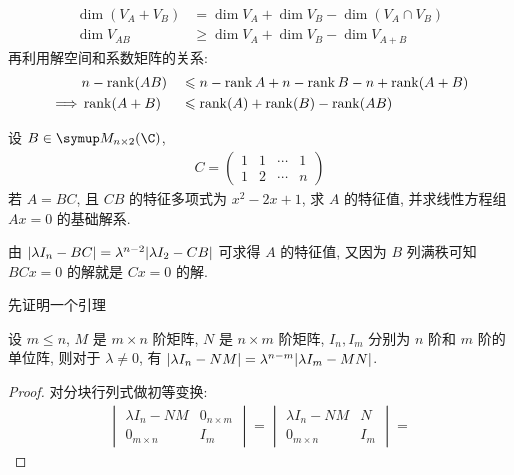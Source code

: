\begin{exercise}[series=exer]
\begin{answer}
\begin{align*}
          \dim(V_{A} + V_{B}) & = \dim V_{A} + \dim V_{B} - \dim(V_{A} \cap V_{B})\\
          \dim V_{AB} & \ge  \dim V_{A} + \dim V_{B} - \dim V_{A + B}
      \end{align*}
      再利用解空间和系数矩阵的关系:
      \begin{alignat*}{2}
          & n - \rank (AB) && \leqslant  n - \rank A + n - \rank B - n + \rank (A + B) \\
          \implies & \rank(A + B) && \leqslant \rank(A) + \rank(B) - \rank(AB)
      \end{alignat*}
  \end{answer}
  \item 设 $ B \in \MM[\C][n \times 2] $,
  \begin{align*}
      C = \begin{pmatrix}
          1 & 1 & \cdots & 1\\
          1 & 2 & \cdots & n
      \end{pmatrix}
  \end{align*}
  若 $ A = BC $, 且 $ CB $ 的特征多项式为 $ x^{2} - 2x + 1 $, 求 $ A $ 的特征值, 并求线性方程组 $ Ax = 0 $ 的基础解系.
  \begin{hint}
      由 $ \abs{\lambda I_{n} - BC} = \lambda^{n - 2}\abs{\lambda I_{2} - CB} $ 可求得 $ A $ 的特征值, 又因为 $ B $ 列满秩可知 $ BCx=0 $ 的解就是 $ Cx = 0 $ 的解.
  \end{hint}
  \begin{answer}
      先证明一个引理
      \begin{lemma}
          设 $ m \le n $, $ M $ 是 $ m \times n $ 阶矩阵, $ N $ 是 $ n \times m $ 阶矩阵, $ I_{n}, I_{m} $ 分别为 $ n $ 阶和 $ m $ 阶的单位阵, 则对于 $ \lambda \ne 0 $, 有 $ \abs{\lambda I_{n} - NM} = \lambda^{n - m}\abs{\lambda I_{m} - MN} $.
      \end{lemma}
      \begin{proof}
          对分块行列式做初等变换:
          \begin{align*}
              \begin{vmatrix}
                  \lambda I_{n} - NM & 0_{n \times m} \\ 0_{m \times n} & I_{m}
              \end{vmatrix}
              =
              \begin{vmatrix}
                  \lambda I_{n} - NM & N \\ 0_{m \times n} & I_{m}
              \end{vmatrix}
              =

\end{align*}
\end{proof}
\end{answer}
\end{exercise}

